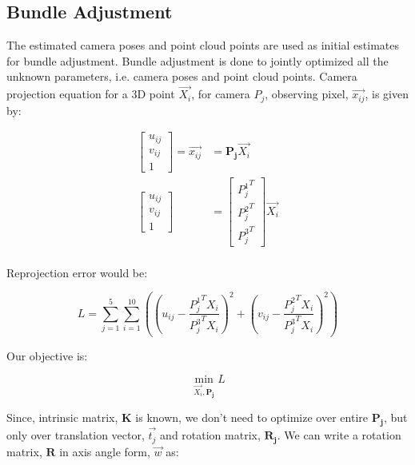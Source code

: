\documentclass{article}
\begin{document}
\subsection{Bundle Adjustment}
The estimated camera poses and point cloud points are used as initial estimates for bundle adjustment. Bundle adjustment is done to jointly optimized all the unknown parameters, i.e. camera poses and point cloud points. 
Camera projection equation for a 3D point $\vec{X_i}$, for camera $P_j$, observing pixel, $\vec{x_{ij}}$, is given by:

\begin{align}
    \begin{bmatrix} u_{ij} \\ v_{ij} \\ 1 \end{bmatrix} = \vec{x_{ij}} &= \mathbf{P_j} \vec{X_i} \\
    \begin{bmatrix} u_{ij} \\ v_{ij} \\ 1 \end{bmatrix} &= \begin{bmatrix}  {P_j^1}^T \\ {P_j^2}^T \\ {P_j^3}^T \end{bmatrix} \vec{X_i} \\
\end{align}

Reprojection error would be:


\begin{equation}
    L = \sum_{j=1}^{5} \sum_{i=1}^{10} \left( \left( u_{ij} - \frac{{P_j^1}^T X_i}{{P_j^3}^T X_i} \right)^2 + \left( v_{ij} - \frac{{P_j^2}^T X_i}{{P_j^3}^T X_i} \right)^2 \right)
\end{equation}

Our objective is:

\begin{equation}
    \min_{\vec{X_i}, \mathbf{P_j}} L
\end{equation}

Since, intrinsic matrix, $\mathbf{K}$ is known, we don't need to optimize over entire $\mathbf{P_j}$, but only over translation vector, $\vec{t_j}$ and rotation matrix, $\mathbf{R_j}$.
We can write a rotation matrix, $\mathbf{R}$ in axis angle form, $\vec{w}$ as:
\end{document}
